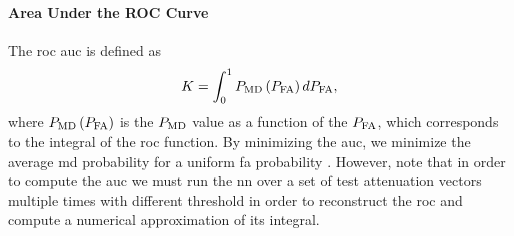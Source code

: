 \documentclass[conference]{IEEEtran}
\begin{document}
\paragraph{Area Under the ROC Curve} The \ac{roc} \ac{auc} is defined as 
\begin{equation}
    K  = \int_{0}^{1} P_{\rm MD}\left(P_{\rm FA}\right) d P_{\rm FA},
\end{equation}
where $P_{\rm MD}\left(P_{\rm FA}\right)$ is the $P_{\rm MD}$ value as a function of the $P_{\rm FA}$, which corresponds to the integral of the \ac{roc} function. By minimizing the \ac{auc}, we minimize the average \ac{md} probability for a uniform \ac{fa} probability
. However, note that in order to compute the \ac{auc} we must run the \ac{nn} over a set of test attenuation vectors multiple times with different threshold in order to reconstruct the \ac{roc} and compute a numerical approximation of its integral.
\end{document}

